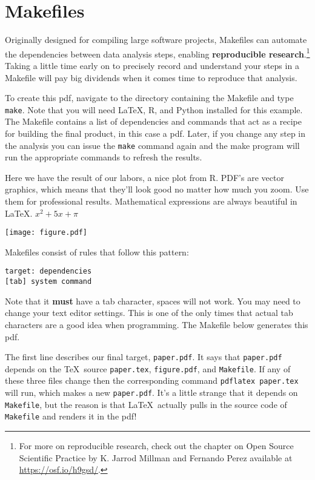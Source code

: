 \documentclass[12pt]{article}
\begin{document}
\section*{Makefiles}

Originally designed for compiling large software projects, Makefiles can automate the dependencies between data analysis steps, enabling \textbf{reproducible research}.\footnote{For more on reproducible research, check out the chapter on Open Source Scientific Practice by K. Jarrod Millman and Fernando Perez available at \url{https://osf.io/h9gsd/}.}
Taking a little time early on to precisely record and understand your steps in a Makefile will pay big dividends when it comes time to reproduce that analysis.

To create this pdf, navigate to the directory containing the Makefile and type {\tt make}. Note that you will need \LaTeX, R, and Python installed for this example. The Makefile contains a list of dependencies and commands that act as a recipe for building the final product, in this case a pdf. Later, if you change any step in the analysis you can issue the {\tt make} command again and the make program will run the appropriate commands to refresh the results.

Here we have the result of our labors, a nice plot from R. PDF's are vector graphics, which means that they'll look good no matter how much you zoom. Use them for professional results. Mathematical expressions are always beautiful in \LaTeX. $x^2 + 5x + \pi$

\centerline{\texttt{[image: figure.pdf]}}

\newpage

Makefiles consist of rules that follow this pattern:

\begin{lstlisting}
target: dependencies
[tab] system command
\end{lstlisting}

Note that it \textbf{must} have a tab character, spaces will not work. You may need to change your text editor settings. This is one of the only times that actual tab characters are a good idea when programming. The Makefile below generates this pdf.

\vspace{0.3in}



\vspace{0.3in}

The first line describes our final target, {\tt paper.pdf}. It says that {\tt paper.pdf} depends on the \TeX\ source {\tt paper.tex}, {\tt figure.pdf}, and {\tt Makefile}. If any of these three files change then the corresponding command {\tt pdflatex paper.tex} will run, which makes a new {\tt paper.pdf}. It's a little strange that it depends on {\tt Makefile}, but the reason is that \LaTeX\ actually pulls in the source code of {\tt Makefile} and renders it in the pdf!
\end{document}
